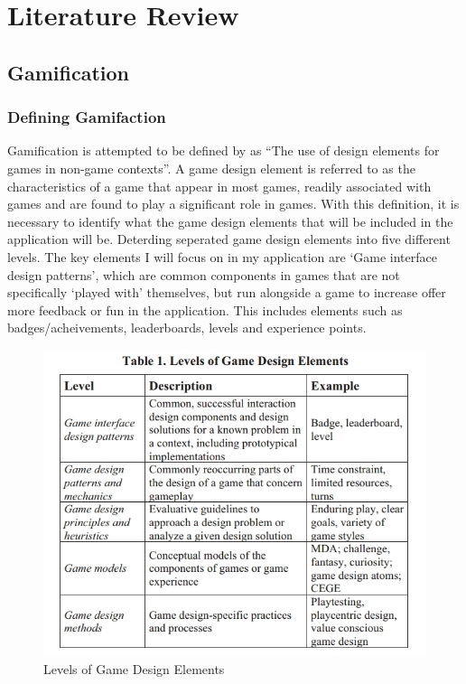 \chapter{Literature Review}
\label{chap:litReview}

\section{Gamification}


\subsection{Defining Gamifaction}
Gamification is attempted to be defined by \cite{Deterding:2011:GDE:2181037.2181040} as ``The use of design elements for games in non-game contexts''. 
A game design element is referred to as the characteristics of a game that appear in most games, readily associated with games and are found to play a significant role in games.
With this definition, it is necessary to identify what the game design elements that will be included in the application will be. 
Deterding seperated game design elements into five different levels. 
The key elements I will focus on in my application are `Game interface design patterns', which are common components in games that are not specifically `played with' themselves, but run alongside a game to increase offer more feedback or fun in the application.
This includes elements such as badges/acheivements, leaderboards, levels and experience points.

\begin{figure}[ht]
	\centering
	\includegraphics[scale=0.45]{images/DeterdingsLevelsOfGameDesignElements.jpg}
	\caption{Levels of Game Design Elements}
	\label{fig:GameDesignElements}
\end{figure}

